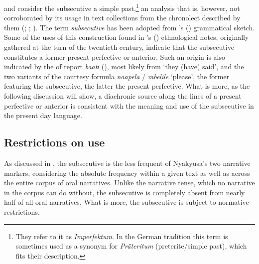 \citet{SchumannK1899} and \citet{EndemannC1914} consider the subsecutive a simple past,\footnote{They refer to it as \textit{Imperfektum}. In the German tradition this term is sometimes used as a synonym for \textit{Präteritum} (preterite/simple past), which fits their description.} an analysis that is, however, not corroborated by its usage in text collections from the chronolect described by them (\citealt{BergerP1933}; \citealt{BusseJ1942}; \citeyear{BusseJ1949}). The term \textit{subsecutive} has been adopted from \citeauthor{MwangokaNVoorhoeveJ1960b}'s (\citeyear{MwangokaNVoorhoeveJ1960b}) grammatical sketch. Some of the uses of this construction found in \citeauthor{MeyerT1989}'s (\citeyear{MeyerT1989}) ethnological notes, originally gathered at the turn of the twentieth century, indicate that the subsecutive constitutes a former present perfective or anterior. Such an origin is also indicated by the  of report \textit{baatɪ} (), most likely from \lq they (have) said', and the two variants of the courtesy formula \textit{naapela} / \textit{mbelile} `please', the former featuring the subsecutive, the latter the present perfective. What is more, as the following discussion will show, a diachronic source along the lines of a present perfective or anterior is consistent with the meaning and use of the subsecutive in the present day language.

\subsection{Restrictions on use}\label{SubsecutiveAndNarrative}
As discussed in , the subsecutive is the less frequent of Nyakyusa's two narrative markers, considering the absolute frequency within a given text as well as across the entire corpus of oral narratives. Unlike the narrative tense, which no narrative in the corpus can do without, the subsecutive is completely absent from nearly half of all oral narratives. What is more, the subsecutive is subject to normative restrictions.

